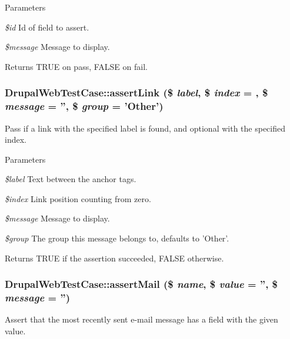 \begin{DoxyParams}{Parameters}
\item[{\em \$id}]Id of field to assert. \item[{\em \$message}]Message to display. \end{DoxyParams}
\begin{DoxyReturn}{Returns}
TRUE on pass, FALSE on fail. 
\end{DoxyReturn}
\hypertarget{class_drupal_web_test_case_aa78cd0d7454235fcad55aaf14a77ed40}{
\subsubsection[{assertLink}]{\setlength{\rightskip}{0pt plus 5cm}DrupalWebTestCase::assertLink (\$ {\em label}, \/  \$ {\em index} = {}, \/  \$ {\em message} = {\ttfamily ''}, \/  \$ {\em group} = {\ttfamily 'Other'})}}
\label{class_drupal_web_test_case_aa78cd0d7454235fcad55aaf14a77ed40}
Pass if a link with the specified label is found, and optional with the specified index.


\begin{DoxyParams}{Parameters}
\item[{\em \$label}]Text between the anchor tags. \item[{\em \$index}]Link position counting from zero. \item[{\em \$message}]Message to display. \item[{\em \$group}]The group this message belongs to, defaults to 'Other'. \end{DoxyParams}
\begin{DoxyReturn}{Returns}
TRUE if the assertion succeeded, FALSE otherwise. 
\end{DoxyReturn}
\hypertarget{class_drupal_web_test_case_ad318f30726058caea940c1aeed1bd182}{
\subsubsection[{assertMail}]{\setlength{\rightskip}{0pt plus 5cm}DrupalWebTestCase::assertMail (\$ {\em name}, \/  \$ {\em value} = {\ttfamily ''}, \/  \$ {\em message} = {\ttfamily ''})}}
\label{class_drupal_web_test_case_ad318f30726058caea940c1aeed1bd182}
Assert that the most recently sent e-\/mail message has a field with the given value.


